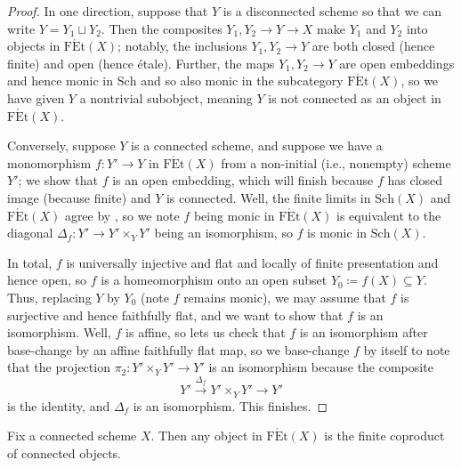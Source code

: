 \documentclass{amsart}
\begin{document}
\begin{proof}
    In one direction, suppose that $Y$ is a disconnected scheme so that we can write $Y=Y_1\sqcup Y_2$. Then the composites $Y_1,Y_2\to Y\to X$ make $Y_1$ and $Y_2$ into objects in $\mathrm{F\acute Et}(X)$; notably, the inclusions $Y_1,Y_2\to Y$ are both closed (hence finite) and open (hence \'etale). Further, the maps $Y_1,Y_2\to Y$ are open embeddings and hence  monic in $\mathrm{Sch}$ and so also monic in the subcategory $\mathrm{F\acute Et}(X)$, so we have given $Y$ a nontrivial subobject, meaning $Y$ is not connected as an object in $\mathrm{F\acute Et}(X)$.

    Conversely, suppose $Y$ is a connected scheme, and suppose we have a monomorphism $f\colon Y'\to Y$ in $\mathrm{F\acute Et}(X)$ from a non-initial (i.e., nonempty) scheme $Y'$; we show that $f$ is an open embedding, which will finish because $f$ has closed image (because finite) and $Y$ is connected. Well, the finite limits in $\mathrm{Sch}(X)$ and $\mathrm{F\acute Et}(X)$ agree by , so we note $f$ being monic in $\mathrm{F\acute Et}(X)$ is equivalent to the diagonal $\Delta_f\colon Y'\to Y'\times_YY'$ being an isomorphism, so $f$ is monic in $\mathrm{Sch}(X)$.

    In total, $f$ is universally injective and flat and locally of finite presentation and hence open, so $f$ is a homeomorphism onto an open subset $Y_0\coloneqq f(X)\subseteq Y$. Thus, replacing $Y$ by $Y_0$ (note $f$ remains monic), we may assume that $f$ is surjective and hence faithfully flat, and we want to show that $f$ is an isomorphism. Well, $f$ is affine, so  lets us check that $f$ is an isomorphism after base-change by an affine faithfully flat map, so we base-change $f$ by itself to note that the projection $\pi_2\colon Y'\times_YY'\to Y'$ is an isomorphism because the composite
    \[Y'\stackrel{\Delta_f}\to Y'\times_YY'\to Y'\]
    is the identity, and $\Delta_f$ is an isomorphism. This finishes.
\end{proof}
\begin{proposition} \label{prop:fin-et-connected-decomp}
    Fix a connected scheme $X$. Then any object in $\mathrm{F\acute Et}(X)$ is the finite coproduct of connected objects.
\end{proposition}
\end{document}
